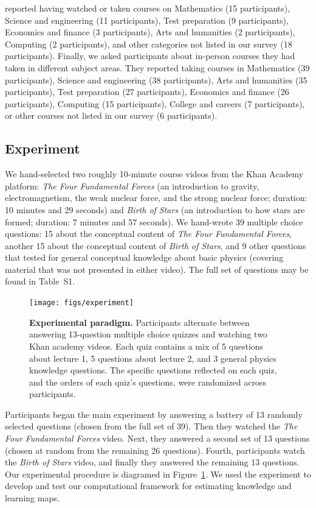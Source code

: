 \documentclass[10pt]{article}
\newcommand{\questions}{S1}
\begin{document}
reported having watched or taken courses on Mathematics (15
participants), Science and engineering (11 participants), Test
preparation (9 participants), Economics and finance (3 participants),
Arts and humanities (2 participants), Computing (2 participants), and
other categories not listed in our survey (18 participants).  Finally,
we asked participants about in-person courses they had taken in
different subject areas.  They reported taking courses in Mathematics
(39 participants), Science and engineering (38 participants), Arts and
humanities (35 participants), Test preparation (27 participants),
Economics and finance (26 participants), Computing (15 participants),
College and careers (7 participants), or other courses not listed in
our survey (6 participants).


\subsection*{Experiment}

We hand-selected two roughly 10-minute course videos from the Khan Academy
platform: \textit{The Four Fundamental Forces} (an introduction to gravity,
electromagnetism, the weak nuclear force, and the strong nuclear force;
duration: 10 minutes and 29 seconds) and \textit{Birth of Stars} (an
introduction to how stars are formed; duration: 7 minutes and 57 seconds). We
hand-wrote 39 multiple choice questions: 15 about the conceptual content of
\textit{The Four Fundamental Forces}, another 15 about the conceptual content
of \textit{Birth of Stars}, and 9 other questions that tested for general
conceptual knowledge about basic physics (covering material that was not
presented in either video). The full set of questions may be found in
Table~\questions.

\begin{figure}[tp]
\centering
\texttt{[image: figs/experiment]}

\caption{\textbf{Experimental paradigm.} Participants alternate between
answering 13-question multiple choice quizzes and watching two Khan academy
videos. Each quiz contains a mix of 5 questions about lecture 1, 5 questions about lecture 2,
and 3 general physics knowledge questions. The specific questions reflected on
each quiz, and the orders of each quiz's questions, were randomized across
participants.}

\label{fig:experiment}
\end{figure}

Participants began the main experiment by answering a battery of 13 randomly
selected questions (chosen from the full set of 39). Then they watched the
\textit{The Four Fundamental Forces} video. Next, they answered a second set of
13 questions (chosen at random from the remaining 26 questions). Fourth,
participants watch the \textit{Birth of Stars} video, and finally they answered
the remaining 13 questions. Our experimental procedure is diagramed in
Figure~\ref{fig:experiment}. We used the experiment to develop and test our
computational framework for estimating knowledge and learning maps.
\end{document}
